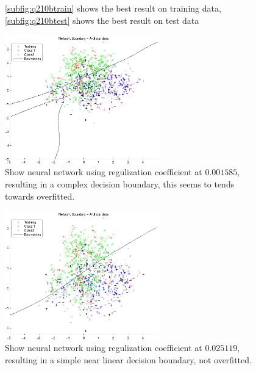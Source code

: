 \begin{figure}[!htbp]
  \centering
  \caption{\ref{subfig:q210btrain} shows the best result on training
    data, \ref{subfig:q210btest} shows the best result on test data}
  \label{fig:q210bregulization}
\end{figure}

\begin{figure}[!htbp]
  \centering
  \includegraphics[width=0.6\textwidth]{./images/q210b_reg2}
  \caption{Show neural network using regulization coefficient at $0.001585$, resulting in
    a complex decision boundary, this seems to tends towards overfitted.}
  \label{fig:q210breg2}
\end{figure}

\begin{figure}[!htbp]
  \centering
  \includegraphics[width=0.6\textwidth]{./images/q210b_reg3}
  \caption{Show neural network using regulization coefficient at $0.025119$, resulting in
    a simple near linear decision boundary, not overfitted.}
  \label{fig:q210breg3}
\end{figure}

